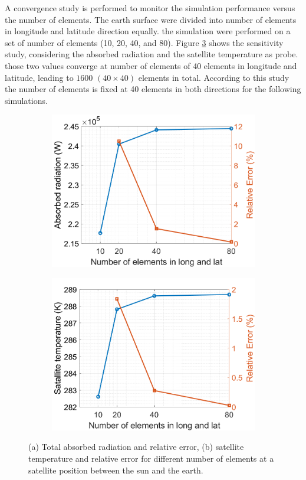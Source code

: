 \documentclass[11pt]{article}
\begin{document}
A convergence study is performed to monitor the simulation performance versus the number of elements. The earth surface were divided into number of elements in longitude and latitude direction equally. the simulation were performed on a set of number of elements (10, 20, 40, and 80). Figure \ref{fig:ss} shows the sensitivity study, considering the absorbed radiation and the satellite temperature as probe. those two values converge at number of elements of 40 elements in longitude and latitude, leading to $1600$ $(40\times40)$ elements in total. According to this study the number of elements is fixed at 40 elements in both directions for the following simulations.

\begin{figure}[h]
    \centering
    \begin{subfigure}[b]{0.48\textwidth}
        \includegraphics[width = 0.8 \textwidth]{Matlab/Sensitivity/fig_Q_sensitivity_0_180.png}
        \caption{}
        \label{fig:ssa}    
    \end{subfigure}
    \begin{subfigure}[b]{0.48\textwidth}
        \includegraphics[width = 0.8 \textwidth]{Matlab/Sensitivity/fig_temp_sensitivity_0_180.png}
        \caption{}
        \label{fig:ssb}    
    \end{subfigure}
    \caption{(a) Total absorbed radiation and relative error, (b) satellite temperature and relative error for different number of elements at a satellite position between the sun and the earth.}
    \label{fig:ss}
\end{figure}
\end{document}
